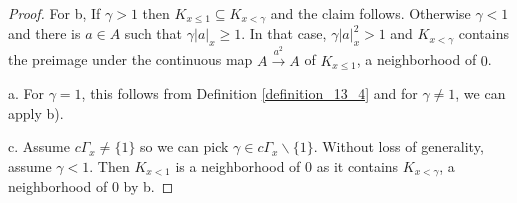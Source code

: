 \documentclass[8pt]{article}
\numberwithin{equation}{section}
\newcommand{\ab}[1]{\vert #1 \vert}
\newcommand{\cGamma}[0]{c\Gamma}
\begin{document}
\begin{proof}
    For b, If $\gamma>1$ then $K_{x\leq1}\subseteq K_{x<\gamma}$ and the claim follows. Otherwise $\gamma<1$ and there is $a\in A$ such that $\gamma\ab{a}_x\geq1$. In that case, $\gamma\ab{a}_x^2>1$ and $K_{x<\gamma}$ contains the preimage under the continuous map $A\stackrel{a^2}{\to} A$ of $K_{x\leq1}$, a neighborhood of $0$.
    \par a. For $\gamma=1$, this follows from Definition \ref{definition_13_4} and for $\gamma\not=1$, we can apply b). 
    \par c. Assume $\cGamma_x\not=\{1\}$ so we can pick $\gamma\in\cGamma_x\backslash\{1\}$. Without loss of generality, assume $\gamma<1$. Then $K_{x<1}$ is a neighborhood of $0$ as it contains $K_{x<\gamma}$, a neighborhood of $0$ by b.
\end{proof}
\end{document}
